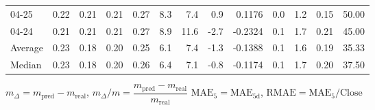 \begin{threeparttable}
{\begin{tabular}{lrrrrrrrrrrrr}
  04-25 &          0.22 &          0.21 &          0.21 &        0.27 &                 8.3 &                 7.4 &        0.9 &       0.1176 &                 0.0 &              1.2 &            0.15 &                  50.00 \\
  04-24 &          0.21 &          0.21 &          0.21 &        0.27 &                 8.9 &                11.6 &       -2.7 &      -0.2324 &                 0.1 &              1.7 &            0.21 &                  45.00 \\
Average &          0.23 &          0.18 &          0.20 &        0.25 &                 6.1 &                 7.4 &       -1.3 &      -0.1388 &                 0.1 &              1.6 &            0.19 &                  35.33 \\
 Median &          0.23 &          0.18 &          0.20 &        0.26 &                 6.4 &                 7.1 &       -0.8 &      -0.1174 &                 0.1 &              1.7 &            0.20 &                  37.50 \\
\bottomrule
\end{tabular}
}
\begin{tablenotes}\footnotesize
\item $m_\Delta=m_{\text{pred}}-m_{\text{real}}$,
$m_\Delta/m=\dfrac{m_{\text{pred}}-m_{\text{real}}}{m_{\text{real}}}$
$\mathrm{MAE}_5=\mathrm{MAE}_{5\text{d}}$,
$\mathrm{RMAE}=\mathrm{MAE}_5/\text{Close}$
\end{tablenotes}
\end{threeparttable}
\endgroup

